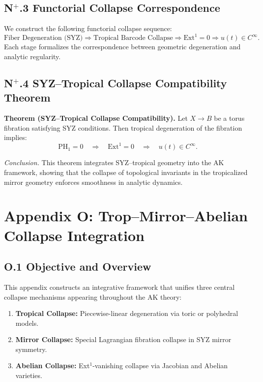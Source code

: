 \documentclass[11pt]{article}
\begin{document}
\begin{axiom}
\begin{axiom}
{{\subsection*{N$^+$.3 Functorial Collapse Correspondence}
We construct the following functorial collapse sequence:
\[
\text{Fiber Degeneration (SYZ)} \Rightarrow \text{Tropical Barcode Collapse} \Rightarrow \mathrm{Ext}^1 = 0 \Rightarrow u(t) \in C^\infty.
\]
Each stage formalizes the correspondence between geometric degeneration and analytic regularity.

\subsection*{N$^+$.4 SYZ–Tropical Collapse Compatibility Theorem}
\textbf{Theorem (SYZ–Tropical Collapse Compatibility).}  
Let \( X \to B \) be a torus fibration satisfying SYZ conditions. Then tropical degeneration of the fibration implies:
\[
\mathrm{PH}_1 = 0 \quad \Rightarrow \quad \mathrm{Ext}^1 = 0 \quad \Rightarrow \quad u(t) \in C^\infty.
\]

\textit{Conclusion.}  
This theorem integrates SYZ–tropical geometry into the AK framework, showing that the collapse of topological invariants in the tropicalized mirror geometry enforces smoothness in analytic dynamics.



\section*{Appendix O: Trop--Mirror--Abelian Collapse Integration}

\subsection*{O.1 Objective and Overview}

This appendix constructs an integrative framework that unifies three central collapse mechanisms  
appearing throughout the AK theory:

\begin{enumerate}
  \item \textbf{Tropical Collapse:} Piecewise-linear degeneration via toric or polyhedral models.
  \item \textbf{Mirror Collapse:} Special Lagrangian fibration collapse in SYZ mirror symmetry.
  \item \textbf{Abelian Collapse:} Ext$^1$-vanishing collapse via Jacobian and Abelian varieties.
\end{enumerate}

}}
\end{axiom}
\end{axiom}
\end{document}
